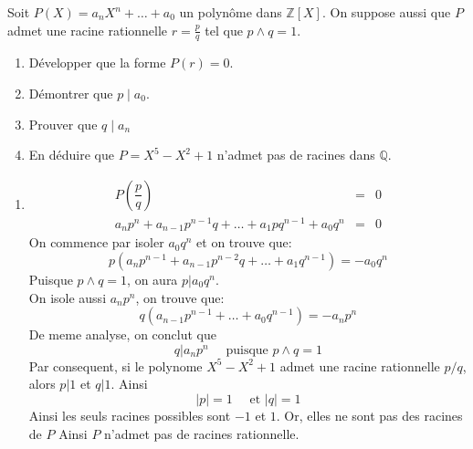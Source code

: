 \documentclass{report}
\begin{document}
\qs{}
{
  Soit $P(X)=a_nX^n+\ldots+a_0$ un polynôme dans $\mathbb{Z}[X]$. On suppose aussi
que $P$ admet une racine rationnelle $r=\frac{p}{q}$ tel que $p\wedge q
=1$.
\begin{enumerate}
  \item Développer que la forme $P(r)=0$.
  \item Démontrer que $p\;|\; a_0$.
  \item Prouver que $q\;|\; a_n$
  \item En déduire que $P=X^5 - X^2+1$ n'admet pas de racines dans
    $\mathbb{Q}$.
\end{enumerate}
}
\begin{myproof}
  \begin{enumerate}
    \item 
      \begin{eqnarray*}
        P\left(\dfrac{p}{q}\right) &=& 0\\[4pt]
        a_np^n + a_{n-1}p^{n-1}q+\ldots+a_1pq^{n-1} + a_0q^n&=& 0
      \end{eqnarray*}
      On commence par isoler $a_0q^n$ et on trouve que:
      $$
      p\left(a_n p^{n-1} + a_{n-1}p^{n-2}q + \ldots + a_1q^{n-1}\right) = -a_0q^n
      $$
      Puisque $p \wedge q = 1 $, on aura $p | a_0q^n$.\\

      On isole aussi $a_np^n$, on trouve que:
      $$
      q\left(a_{n-1}p^{n-1} + \ldots+ a_0q^{n-1}\right) = -a_np^n
      $$
      De meme analyse, on conclut que 
      $$
      q | a_np^n \quad \text { puisque } p \wedge q = 1
      $$
      Par consequent, si le polynome $X^5 - X^2 +1$ admet une racine rationnelle $p/q$, alors $p|1$ et $q|1$. Ainsi
      $$
      \vert p \vert = 1 \quad \text{ et } \vert q \vert = 1
      $$
      Ainsi les seuls racines possibles sont $-1$ et $1$. Or, elles ne sont pas des racines de $P$ 
      Ainsi $P$ n'admet pas de racines rationnelle.
  \end{enumerate}
\end{myproof}

\end{document}
